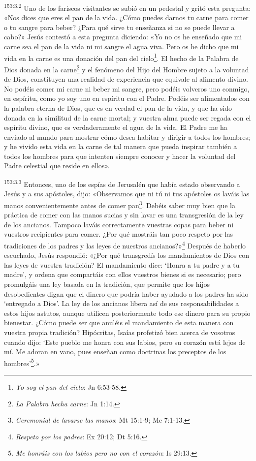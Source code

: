\par
\textsuperscript{153:3.2} Uno de los fariseos visitantes se subió en un pedestal y gritó esta pregunta: «Nos dices que eres el pan de la vida. ¿Cómo puedes darnos tu carne para comer o tu sangre para beber? ¿Para qué sirve tu enseñanza si no se puede llevar a cabo?» Jesús contestó a esta pregunta diciendo: «Yo no os he enseñado que mi carne sea el pan de la vida ni mi sangre el agua viva. Pero os he dicho que mi vida en la carne es una donación del pan del cielo\footnote{\textit{Yo soy el pan del cielo}: Jn 6:53-58.}. El hecho de la Palabra de Dios donada en la carne\footnote{\textit{La Palabra hecha carne}: Jn 1:14.} y el fenómeno del Hijo del Hombre sujeto a la voluntad de Dios, constituyen una realidad de experiencia que equivale al alimento divino. No podéis comer mi carne ni beber mi sangre, pero podéis volveros uno conmigo, en espíritu, como yo soy uno en espíritu con el Padre. Podéis ser alimentados con la palabra eterna de Dios, que es en verdad el pan de la vida, y que ha sido donada en la similitud de la carne mortal; y vuestra alma puede ser regada con el espíritu divino, que es verdaderamente el agua de la vida. El Padre me ha enviado al mundo para mostrar cómo desea habitar y dirigir a todos los hombres; y he vivido esta vida en la carne de tal manera que pueda inspirar también a todos los hombres para que intenten siempre conocer y hacer la voluntad del Padre celestial que reside en ellos».

\par
\textsuperscript{153:3.3} Entonces, uno de los espías de Jerusalén que había estado observando a Jesús y a sus apóstoles, dijo: «Observamos que ni tú ni tus apóstoles os laváis las manos convenientemente antes de comer pan\footnote{\textit{Ceremonial de lavarse las manos}: Mt 15:1-9; Mc 7:1-13.}. Debéis saber muy bien que la práctica de comer con las manos sucias y sin lavar es una transgresión de la ley de los ancianos. Tampoco laváis correctamente vuestras copas para beber ni vuestros recipientes para comer. ¿Por qué mostráis tan poco respeto por las tradiciones de los padres y las leyes de nuestros ancianos?»\footnote{\textit{Respeto por los padres}: Ex 20:12; Dt 5:16.} Después de haberlo escuchado, Jesús respondió: «¿Por qué transgredís los mandamientos de Dios con las leyes de vuestra tradición? El mandamiento dice: `Honra a tu padre y a tu madre', y ordena que compartáis con ellos vuestros bienes si es necesario; pero promulgáis una ley basada en la tradición, que permite que los hijos desobedientes digan que el dinero que podría haber ayudado a los padres ha sido `entregado a Dios'. La ley de los ancianos libera así de sus responsabilidades a estos hijos astutos, aunque utilicen posteriormente todo ese dinero para su propio bienestar. ¿Cómo puede ser que anuléis el mandamiento de esta manera con vuestra propia tradición? Hipócritas, Isaías profetizó bien acerca de vosotros cuando dijo: `Este pueblo me honra con sus labios, pero su corazón está lejos de mí. Me adoran en vano, pues enseñan como doctrinas los preceptos de los hombres'\footnote{\textit{Me honráis con los labios pero no con el corazón}: Is 29:13.}.»

